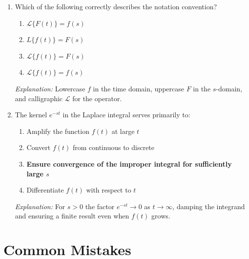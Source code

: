 \documentclass[12pt,a4paper]{article}
\begin{document}
\begin{enumerate}[leftmargin=1.5cm, label=\textbf{MCQ\arabic*.}]
  \item Which of the following correctly describes the notation convention?
  \begin{enumerate}[label=(\alph*)]
    \item $\mathcal{L}\{F(t)\} = f(s)$
    \item $L\{f(t)\} = F(s)$
    \item \textbf{$\mathcal{L}\{f(t)\} = F(s)$}
    \item $\mathcal{L}\{f(t)\} = f(s)$
  \end{enumerate}
  \textit{Explanation:} Lowercase $f$ in the time domain, uppercase $F$ in
  the $s$-domain, and calligraphic $\mathcal{L}$ for the operator.

  \item The kernel $e^{-st}$ in the Laplace integral serves primarily to:
  \begin{enumerate}[label=(\alph*)]
    \item Amplify the function $f(t)$ at large $t$
    \item Convert $f(t)$ from continuous to discrete
    \item \textbf{Ensure convergence of the improper integral for sufficiently large $s$}
    \item Differentiate $f(t)$ with respect to $t$
  \end{enumerate}
  \textit{Explanation:} For $s > 0$ the factor $e^{-st} \to 0$ as
  $t \to \infty$, damping the integrand and ensuring a finite result even
  when $f(t)$ grows.

\end{enumerate}

\section{Common Mistakes}
\end{document}
